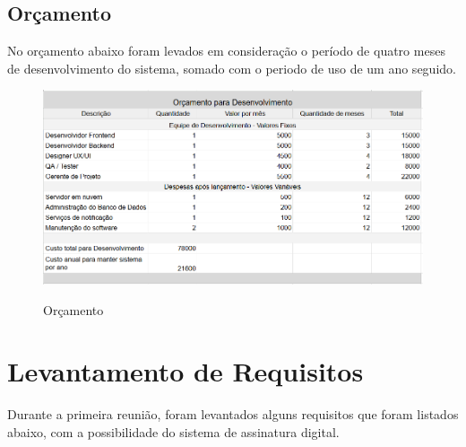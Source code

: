 \documentclass[12pt,a4paper]{report}
\begin{document}
\section{Orçamento}
No orçamento abaixo foram levados em consideração o período de quatro meses de desenvolvimento do sistema, somado com o periodo de uso de um ano seguido.
\begin{figure}[!h]
	\centering
	\includegraphics[width = \linewidth]{imagens/orcamento.png}
	\label{Orçamento}
	\caption{Orçamento}
\end{figure}



\chapter{Levantamento de Requisitos}
Durante a primeira reunião, foram levantados alguns requisitos que foram listados abaixo, com a possibilidade do sistema de assinatura digital. 
\end{document}
